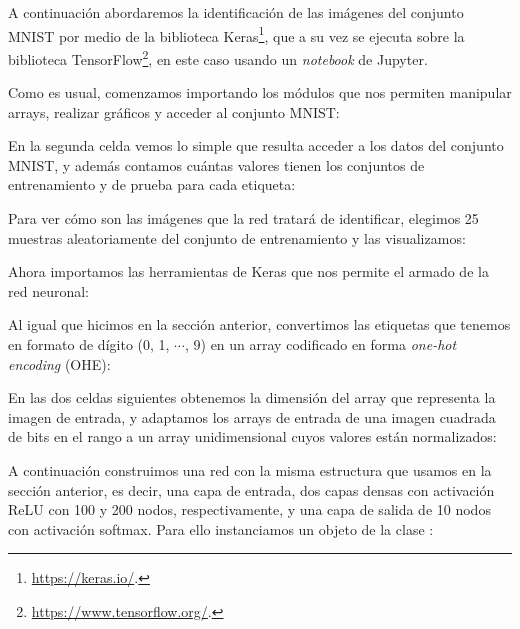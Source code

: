 A continuación abordaremos la identificación de las imágenes del conjunto MNIST por medio de la biblioteca Keras\footnote{\url{https://keras.io/}.}, que a su vez se ejecuta sobre la biblioteca TensorFlow\footnote{\url{https://www.tensorflow.org/}.}, en este caso usando un \textit{notebook} de Jupyter.

Como es usual, comenzamos importando los módulos que nos permiten manipular arrays, realizar gráficos y acceder al conjunto MNIST:


En la segunda celda vemos lo simple que resulta acceder a los datos del conjunto MNIST, y además contamos cuántas valores tienen los conjuntos de entrenamiento y de prueba para cada etiqueta:


Para ver cómo son las imágenes que la red tratará de identificar, elegimos 25 muestras aleatoriamente del conjunto de entrenamiento y las visualizamos:


Ahora importamos las herramientas de Keras que nos permite el armado de la red neuronal:
    

Al igual que hicimos en la sección anterior, convertimos las etiquetas que tenemos en formato de dígito (0, 1, $\cdots$, 9) en un array codificado en forma \textit{one-hot encoding} (OHE):


En las dos celdas siguientes obtenemos la dimensión del array que representa la imagen de entrada, y adaptamos los arrays de entrada de una imagen cuadrada de bits en el rango \mip{[0, 255]} a un array unidimensional cuyos valores están normalizados:


A continuación construimos una red con la misma estructura que usamos en la sección anterior, es decir, una capa de entrada, dos capas densas con activación ReLU con 100 y 200 nodos, respectivamente, y una capa de salida de 10 nodos con activación softmax. Para ello instanciamos un objeto  de la clase :

